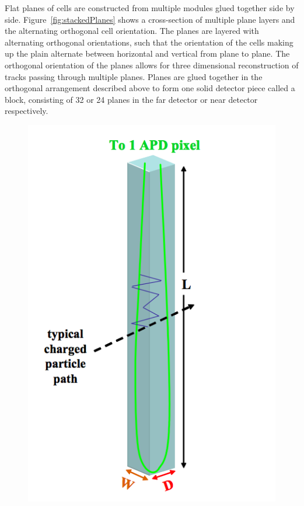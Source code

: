 Flat planes of cells are constructed from multiple modules glued
together side by side. 
Figure~\ref{fig:stackedPlanes} shows a cross-section of multiple plane
layers and the alternating orthogonal cell orientation.
The planes are layered with alternating orthogonal
orientations, such that the orientation of the cells making up the
plain alternate between horizontal and vertical from plane to
plane. The orthogonal 
orientation of the planes allows for three dimensional reconstruction
of tracks passing through multiple planes. Planes are glued together
in the orthogonal arrangement described above to form one solid
detector piece called a block, consisting of 32 or 24 planes in the
far detector or near detector respectively.


\begin{figure}
  \centering
  \begin{minipage}{.45\textwidth}
    \centering
    \includegraphics[height=0.4\textheight]{../../img/det/gen/nova_cell.png}
\end{minipage}
\end{figure}
